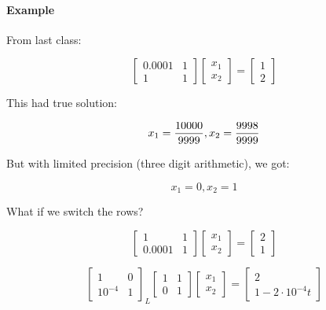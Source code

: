 \documentclass[12pt]{article}
\newcommand{\<}{\langle}
\renewcommand{\>}{\rangle}
\begin{document}
\paragraph{Example} From last class:

\[
	\begin{bmatrix}
		0.0001 & 1 \\ 1 & 1
	\end{bmatrix}
	\begin{bmatrix}
		x_1 \\ x_2
	\end{bmatrix} = 
	\begin{bmatrix}
		1 \\ 2
	\end{bmatrix}
\]

This had true solution:

\[
		x_1 = {10000 \over 9999}, x_2 = {9998 \over 9999}
\]

But with limited precision (three digit arithmetic), we got:

\[
		x_1 = 0, x_2 = 1
\]

What if we switch the rows?

\[
	\begin{bmatrix}
		1 & 1 \\ 0.0001 & 1
	\end{bmatrix}
	\begin{bmatrix}
		x_1 \\ x_2
	\end{bmatrix} = 
	\begin{bmatrix}
		2 \\ 1
	\end{bmatrix}
\]

\[
	\begin{bmatrix}
		1 & 0 \\ 10^{-4} & 1
	\end{bmatrix}_L
	\begin{bmatrix}
		1 & 1 \\ 0 & 1
	\end{bmatrix}
	\begin{bmatrix}
		x_1 \\ x_2
	\end{bmatrix} =
	\begin{bmatrix}
		2 \\ 1 - 2 \cdot 10^{-4}t
	\end{bmatrix}
\]
\end{document}
